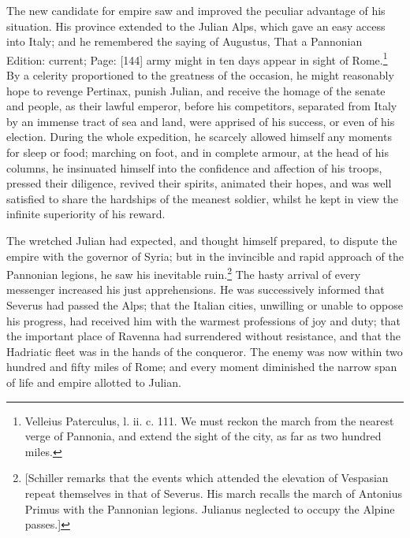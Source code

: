 The new candidate for empire saw and improved the peculiar advantage of his situation. His province extended to the Julian Alps, which gave an easy access into Italy; and he remembered the saying of Augustus, That a Pannonian Edition: current; Page: [144] army might in ten days appear in sight of Rome.\footnote{Velleius Paterculus, l. ii. c. 111. We must reckon the march from the nearest verge of Pannonia, and extend the sight of the city, as far as two hundred miles.} By a celerity proportioned to the greatness of the occasion, he might reasonably hope to revenge Pertinax, punish Julian, and receive the homage of the senate and people, as their lawful emperor, before his competitors, separated from Italy by an immense tract of sea and land, were apprised of his success, or even of his election. During the whole expedition, he scarcely allowed himself any moments for sleep or food; marching on foot, and in complete armour, at the head of his columns, he insinuated himself into the confidence and affection of his troops, pressed their diligence, revived their spirits, animated their hopes, and was well satisfied to share the hardships of the meanest soldier, whilst he kept in view the infinite superiority of his reward.

The wretched Julian had expected, and thought himself prepared, to dispute the empire with the governor of Syria; but in the invincible and rapid approach of the Pannonian legions, he saw his inevitable ruin.\footnote{[Schiller remarks that the events which attended the elevation of Vespasian repeat themselves in that of Severus. His march recalls the march of Antonius Primus with the Pannonian legions. Julianus neglected to occupy the Alpine passes.]} The hasty arrival of every messenger increased his just apprehensions. He was successively informed that Severus had passed the Alps; that the Italian cities, unwilling or unable to oppose his progress, had received him with the warmest professions of joy and duty; that the important place of Ravenna had surrendered without resistance, and that the Hadriatic fleet was in the hands of the conqueror. The enemy was now within two hundred and fifty miles of Rome; and every moment diminished the narrow span of life and empire allotted to Julian.

